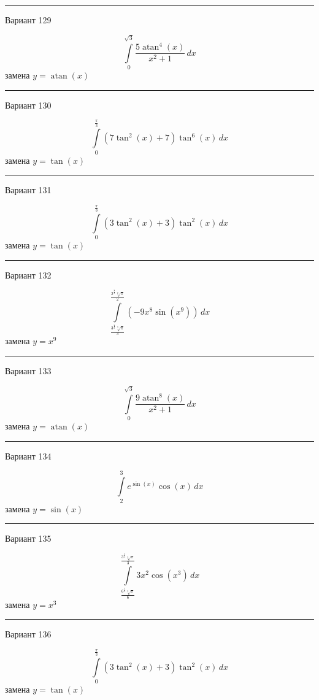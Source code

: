 \documentclass[11pt]{report}
\begin{document}
\rule{\textwidth}{.2mm}

Вариант 129

$$\int\limits_{0}^{\sqrt{3}} \frac{5 \operatorname{atan}^{4}{\left(x \right)}}{x^{2} + 1}\, dx$$
замена $y = \operatorname{atan}{\left(x \right)}$



\rule{\textwidth}{.2mm}

Вариант 130

$$\int\limits_{0}^{\frac{\pi}{3}} \left(7 \tan^{2}{\left(x \right)} + 7\right) \tan^{6}{\left(x \right)}\, dx$$
замена $y = \tan{\left(x \right)}$



\rule{\textwidth}{.2mm}

Вариант 131

$$\int\limits_{0}^{\frac{\pi}{3}} \left(3 \tan^{2}{\left(x \right)} + 3\right) \tan^{2}{\left(x \right)}\, dx$$
замена $y = \tan{\left(x \right)}$



\rule{\textwidth}{.2mm}

Вариант 132

$$\int\limits_{\frac{3^{\frac{8}{9}} \sqrt[9]{\pi}}{3}}^{\frac{2^{\frac{8}{9}} \sqrt[9]{\pi}}{2}} \left(- 9 x^{8} \sin{\left(x^{9} \right)}\right)\, dx$$
замена $y = x^{9}$



\rule{\textwidth}{.2mm}

Вариант 133

$$\int\limits_{0}^{\sqrt{3}} \frac{9 \operatorname{atan}^{8}{\left(x \right)}}{x^{2} + 1}\, dx$$
замена $y = \operatorname{atan}{\left(x \right)}$



\rule{\textwidth}{.2mm}

Вариант 134

$$\int\limits_{2}^{3} e^{\sin{\left(x \right)}} \cos{\left(x \right)}\, dx$$
замена $y = \sin{\left(x \right)}$



\rule{\textwidth}{.2mm}

Вариант 135

$$\int\limits_{\frac{6^{\frac{2}{3}} \sqrt[3]{\pi}}{6}}^{\frac{3^{\frac{2}{3}} \sqrt[3]{\pi}}{3}} 3 x^{2} \cos{\left(x^{3} \right)}\, dx$$
замена $y = x^{3}$



\rule{\textwidth}{.2mm}

Вариант 136

$$\int\limits_{0}^{\frac{\pi}{3}} \left(3 \tan^{2}{\left(x \right)} + 3\right) \tan^{2}{\left(x \right)}\, dx$$
замена $y = \tan{\left(x \right)}$
\end{document}

